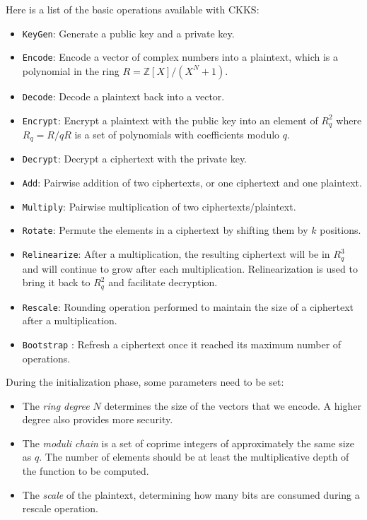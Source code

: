 \documentclass[a4paper,11pt,oneside]{report}
\begin{document}
Here is a list of the basic operations available with CKKS:
\begin{itemize}
    \item \texttt{KeyGen}: Generate a public key and a private key.
    \item \texttt{Encode}: Encode a vector of complex numbers into a plaintext, which is a polynomial in the ring $R = \mathbb{Z}[X]/(X^N + 1)$.
    \item \texttt{Decode}: Decode a plaintext back into a vector.
    \item \texttt{Encrypt}: Encrypt a plaintext with the public key into an element of $R_q^2$ where $R_q = R/qR$ is a set of polynomials with coefficients modulo $q$.
    \item \texttt{Decrypt}: Decrypt a ciphertext with the private key.
    \item \texttt{Add}: Pairwise addition of two ciphertexts, or one ciphertext and one plaintext.
    \item \texttt{Multiply}: Pairwise multiplication of two ciphertexts/plaintext.
    \item \texttt{Rotate}: Permute the elements in a ciphertext by shifting them by $k$ positions.
    \item \texttt{Relinearize}: After a multiplication, the resulting ciphertext will be in $R_q^3$ and will continue to grow after each multiplication. 
    Relinearization is used to bring it back to $R_q^2$ and facilitate decryption.
    \item \texttt{Rescale}: Rounding operation performed to maintain the size of a ciphertext after a multiplication.
    \item \texttt{Bootstrap} \cite{nielsen_bootstrapping_2018}: Refresh a ciphertext once it reached its maximum number of operations.
\end{itemize}

During the initialization phase, some parameters need to be set:

\begin{itemize}
  \item The \emph{ring degree} $N$ determines the size of the vectors that we encode. A higher degree also provides more security.
  \item The \emph{moduli chain} is a set of coprime integers of approximately the same size as $q$. 
  The number of elements should be at least the multiplicative depth of the function to be computed.
  \item The \emph{scale} of the plaintext, determining how many bits are consumed during a rescale operation.
\end{itemize}
\end{document}
